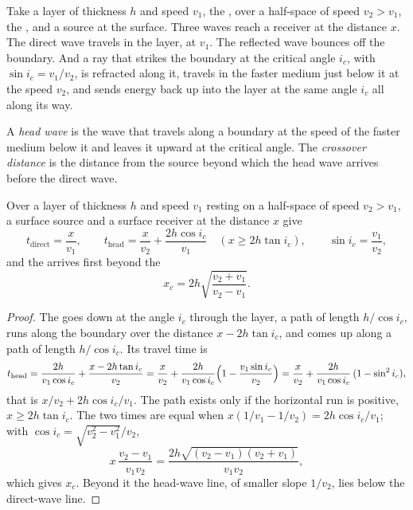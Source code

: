 Take a layer of thickness $h$ and speed $v_1$, the , over a half-space of
speed $v_2 > v_1$, the , and a source at the surface. Three waves reach a
receiver at the distance $x$. The direct wave travels in the layer, at $v_1$.
The reflected wave bounces off the boundary. And a ray that strikes the
boundary at the critical angle $i_c$, with $\sin i_c = v_1/v_2$, is refracted
along it, travels in the faster medium just below it at the speed $v_2$, and
sends energy back up into the layer at the same angle $i_c$ all along its way.

\begin{definition}\label{def:b1:layered-earth:head-wave}
A \emph{head wave} is the wave that travels along a boundary
at the speed of the faster medium below it and leaves it upward at the critical
angle. The \emph{crossover distance} is the distance
from the source beyond which the head wave arrives before the direct wave.
\end{definition}

\begin{theorem}\label{thm:b1:layered-earth:two-layer}
Over a layer of thickness $h$ and speed $v_1$ resting on a half-space of speed
$v_2 > v_1$, a surface source and a surface receiver at the distance $x$ give
\[
  t_{\text{direct}} = \frac{x}{v_1}, \qquad
  t_{\text{head}} = \frac{x}{v_2} + \frac{2h\cos i_c}{v_1}
  \quad (x \ge 2h\tan i_c), \qquad \sin i_c = \frac{v_1}{v_2},
\]
and the  arrives first beyond the 
\[
  x_c = 2h\sqrt{\frac{v_2 + v_1}{v_2 - v_1}}.
\]
\end{theorem}

\begin{proof}
The  goes down at the angle $i_c$ through the layer, a path of length
$h/\cos i_c$, runs along the boundary over the distance $x - 2h\tan i_c$, and
comes up along a path of length $h/\cos i_c$. Its travel time is
\[
  t_{\text{head}} = \frac{2h}{v_1\cos i_c} + \frac{x - 2h\tan i_c}{v_2}
  = \frac{x}{v_2} + \frac{2h}{v_1\cos i_c}\Bigl(1 - \frac{v_1\sin i_c}{v_2}\Bigr)
  = \frac{x}{v_2} + \frac{2h}{v_1\cos i_c}\,(1 - \sin^2 i_c),
\]
that is $x/v_2 + 2h\cos i_c/v_1$. The path exists only if the horizontal run
is positive, $x \ge 2h\tan i_c$. The two times are equal when
$x(1/v_1 - 1/v_2) = 2h\cos i_c/v_1$; with $\cos i_c = \sqrt{v_2^2 - v_1^2}/v_2$,
\[
  x\,\frac{v_2 - v_1}{v_1 v_2} = \frac{2h\sqrt{(v_2 - v_1)(v_2 + v_1)}}{v_1 v_2},
\]
which gives $x_c$. Beyond it the head-wave line, of smaller slope $1/v_2$,
lies below the direct-wave line.
\end{proof}

